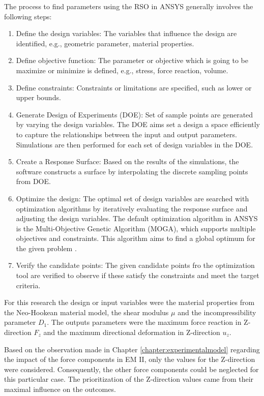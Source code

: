 The process to find parameters using the RSO in ANSYS generally involves the following steps:
\begin{enumerate}
    \item Define the design variables: The variables that influence the design are identified, e.g., geometric parameter, material properties.
    \item Define objective function: The parameter or objective which is going to be maximize or minimize is defined, e.g., stress, force reaction, volume. 
    \item Define constraints: Constraints or limitations are specified, such as lower or upper bounds.
    \item Generate Design of Experiments (DOE): Set of sample points are generated by varying the design variables. The DOE aims set a design a space efficiently to capture the relationships between the input and output parameters. Simulations are then performed for each set of design variables in the DOE.  
    \item Create a Response Surface: Based on the results of the simulations, the software constructs a surface by interpolating the discrete sampling points from DOE.
    \item Optimize the design: The optimal set of design variables are searched with optimization algorithms by iteratively evaluating the response surface and adjusting the design variables. The default optimization algorithm in ANSYS is the Multi-Objective Genetic Algorithm (MOGA), which supports multiple objectives and constraints. This algorithm aims to find a global optimum for the given problem \cite{Grebenisan2017}.
    \item Verify the candidate points: The given candidate points fro the optimization tool are verified to observe if these satisfy the constraints and meet the target criteria.
\end{enumerate}

For this research the design or input variables were the material properties from the Neo-Hookean 
material model, the shear modulus $\mu$ and the incompressibility parameter $D_1$. The outputs parameters 
were the maximum force reaction in Z-direction $F_z$ and the maximum directional deformation in Z-direction $u_z$.

Based on the observation made in Chapter \ref{chapter:experimentalmodel} regarding the impact of the force 
components in EM II, only the values for the Z-direction were considered. Consequently, the other force 
components could be neglected for this particular case. The prioritization of the Z-direction values came from 
their maximal influence on the outcomes.

